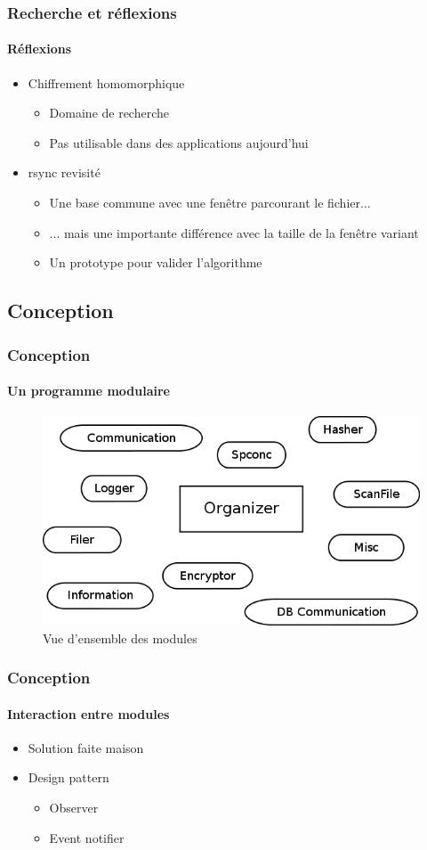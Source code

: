 \documentclass{beamer}
\begin{document}
\begin{frame}
 \frametitle{Recherche et r\'eflexions}
 \framesubtitle{R\'eflexions}
 \begin{itemize}
  \item Chiffrement homomorphique
  \begin{itemize}
   \item Domaine de recherche
   \item Pas utilisable dans des applications aujourd'hui
  \end{itemize}
  \item rsync revisit\'e
  \begin{itemize}
   \item Une base commune avec une fen\^etre parcourant le fichier...
   \item ... mais une importante diff\'erence avec la taille de la fen\^etre
   variant
   \item Un prototype pour valider l'algorithme
  \end{itemize}
 \end{itemize}
\end{frame}

\subsection{Conception}
\begin{frame}
 \frametitle{Conception}
 \framesubtitle{Un programme modulaire}
  \begin{figure}[h!]
    \centering
    \includegraphics[scale=0.42]{softwareDesign/overviewModule.png}
    \caption{Vue d'ensemble des modules}
  \end{figure}
\end{frame}

\begin{frame}
 \frametitle{Conception}
 \framesubtitle{Interaction entre modules}
 \begin{itemize}
  \item Solution faite \flqq maison\frqq
  \item Design pattern
  \begin{itemize}
   \item Observer
   \item Event notifier
  \end{itemize}
 \end{itemize}
\end{frame}
\end{document}
